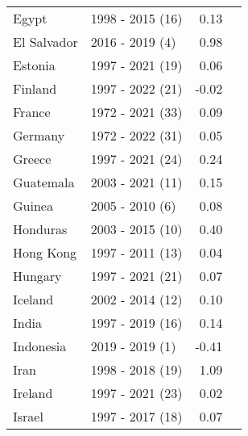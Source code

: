 \begin{table}[H]
{{\begin{tabular}{llrr}
Egypt & 1998 - 2015 (16) & 0.13\\
El Salvador & 2016 - 2019 (4) & 0.98\\
\addlinespace
Estonia & 1997 - 2021 (19) & 0.06\\
Finland & 1997 - 2022 (21) & -0.02\\
France & 1972 - 2021 (33) & 0.09\\
Germany & 1972 - 2022 (31) & 0.05\\
Greece & 1997 - 2021 (24) & 0.24\\
\addlinespace
Guatemala & 2003 - 2021 (11) & 0.15\\
Guinea & 2005 - 2010 (6) & 0.08\\
Honduras & 2003 - 2015 (10) & 0.40\\
Hong Kong & 1997 - 2011 (13) & 0.04\\
Hungary & 1997 - 2021 (21) & 0.07\\
\addlinespace
Iceland & 2002 - 2014 (12) & 0.10\\
India & 1997 - 2019 (16) & 0.14\\
Indonesia & 2019 - 2019 (1) & -0.41\\
Iran & 1998 - 2018 (19) & 1.09\\
Ireland & 1997 - 2021 (23) & 0.02\\
\addlinespace
Israel & 1997 - 2017 (18) & 0.07\\
\bottomrule
\end{tabular}
}

}
\end{table}
